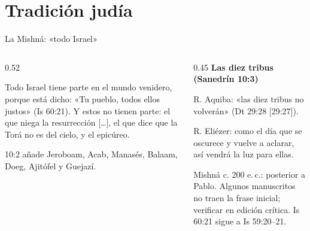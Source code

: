 \section{Tradición judía}
\begin{frame}{La Mishná: «todo Israel»}
\begin{columns}[T,onlytextwidth]
\begin{column}{0.52\textwidth}
\par\smallskip
\begin{cita}[fontupper=\scriptsize\itshape]Todo Israel tiene parte en el mundo venidero, porque está dicho: «Tu pueblo, todos ellos justos» (Is 60:21). Y estos no tienen parte: el que niega la resurrección [\ldots], el que dice que la Torá no es del cielo, y el epicúreo.\end{cita}
\scriptsize 10:2 añade Jeroboam, Acab, Manasés, Balaam, Doeg, Ajitófel y Guejazí. 
\end{column}
\begin{column}{0.45\textwidth}\small\RaggedRight
\textbf{\textcolor{cafe}{Las diez tribus (Sanedrín 10:3)}}\par\smallskip
R. Aquiba: «las diez tribus no volverán» (Dt 29:28 [29:27]).\par\smallskip
R. Eliézer: como el día que se oscurece y vuelve a aclarar, así vendrá la luz para ellas.\par\medskip
\begin{notalam}
Mishná c. 200 e.\,c.: posterior a Pablo. Algunos manuscritos no traen la frase inicial; verificar en edición crítica. Is 60:21 sigue a Is 59:20--21.
\end{notalam}
\end{column}
\end{columns}
\end{frame}


